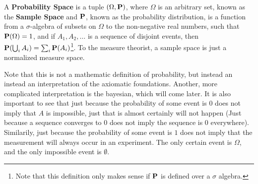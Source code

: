 \begin{definition}
    A {\bf Probability Space} is a tuple $(\Omega, \operatorname{\mathbf{P}})$, where $\Omega$ is an arbitrary set, known as the {\bf Sample Space} and $\operatorname{\mathbf{P}}$, known as the probability distribution, is a function from a $\sigma$-algebra of subsets on $\Omega$ to the non-negative real numbers, such that $\operatorname{\mathbf{P}}(\Omega) = 1$, and if $A_1, A_2, \dots$ is a sequence of disjoint events, then $\operatorname{\mathbf{P}}(\bigcup_i A_i) = \sum_i \operatorname{\mathbf{P}}(A_i)$\footnote{Note that this definition only makes sense if $\operatorname{\mathbf{P}}$ is defined over a $\sigma$ algebra.}. To the measure theorist, a sample space is just a normalized measure space.
\end{definition}

Note that this is not a mathematic definition of probability, but instead an instead an interpretation of the axiomatic foundations. Another, more complicated interpretation is the bayesian, which will come later. It is also important to see that just because the probability of some event is $0$ does not imply that $A$ is impossible, just that is almost certainly will not happen (Just because a sequence converges to $0$ does not imply the sequence is $0$ everywhere). Similarily, just because the probability of some event is $1$ does not imply that the measurement will always occur in an experiment. The only certain event is $\Omega$, and the only impossible event is $\emptyset$.

